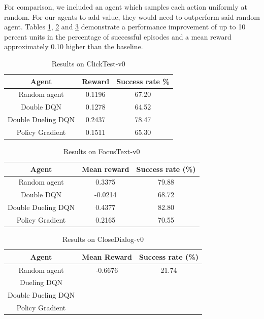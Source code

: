 \documentclass[10pt,journal,compsoc]{IEEEtran}
\begin{document}
For comparison, we included an agent which samples each action uniformly at random. For our agents to add value, they would need to outperform said random agent. Tables \ref{results-clicktest}, \ref{results-focustext} and \ref{results-closedialog} demonstrate a performance improvement of up to 10 percent units in the percentage of successful episodes and a mean reward approximately 0.10 higher than the baseline.

\begin{table}[!h]
\renewcommand{\arraystretch}{1.3}
\caption{Results on ClickTest-v0}
\label{results-clicktest}
\centering
\begin{tabular}{|c||c|c|}
\hline
Agent & Reward & Success rate \% \\
\hline
Random agent & 0.1196 & 67.20\\
\hline
Double DQN & 0.1278 & 64.52\\
\hline
Double Dueling DQN & 0.2437 & 78.47\\

\hline
Policy Gradient & 0.1511 & 65.30\\
\hline
\end{tabular}
\end{table}

\begin{table}[!h]
\renewcommand{\arraystretch}{1.3}
\caption{Results on FocusText-v0}
\label{results-focustext}
\centering
\begin{tabular}{|c||c|c|}
\hline
Agent & Mean reward & Success rate (\%) \\
\hline
Random agent & 0.3375 & 79.88\\
\hline
Double DQN & -0.0214 & 68.72\\
\hline
Double Dueling DQN & 0.4377 & 82.80 \\
\hline
Policy Gradient &  0.2165 & 70.55\\
\hline
\end{tabular}
\end{table}


\begin{table}[!h]
\renewcommand{\arraystretch}{1.3}
\caption{Results on CloseDialog-v0}
\label{results-closedialog}
\centering
\begin{tabular}{|c||c|c|}
\hline
Agent & Mean Reward & Success rate (\%) \\
\hline
Random agent & -0.6676 & 21.74 \\
\hline
Dueling DQN & &\\
\hline
Double Dueling DQN & &\\
\hline
Policy Gradient & &\\
\hline
\end{tabular}
\end{table}
\end{document}
